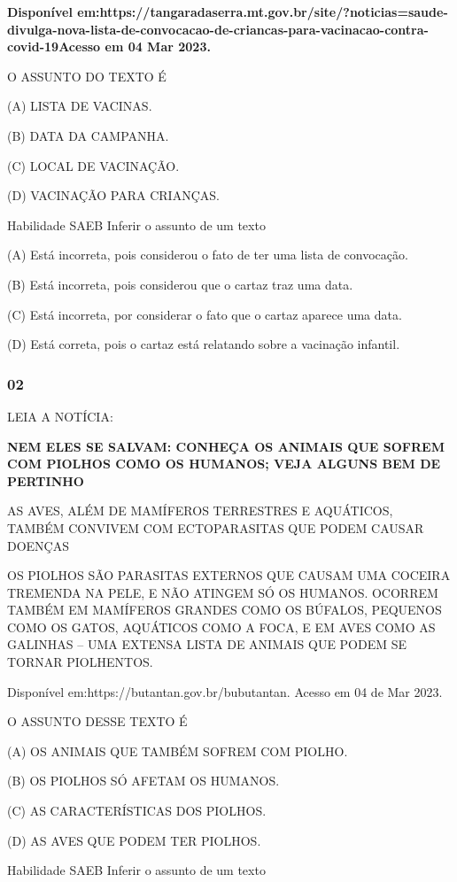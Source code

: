 \textbf{Disponível
em:https://tangaradaserra.mt.gov.br/site/?noticias=saude-divulga-nova-lista-de-convocacao-de-criancas-para-vacinacao-contra-covid-19Acesso
em 04 Mar 2023.}

O ASSUNTO DO TEXTO É

(A) LISTA DE VACINAS.

(B) DATA DA CAMPANHA.

(C) LOCAL DE VACINAÇÃO.

(D) VACINAÇÃO PARA CRIANÇAS.

Habilidade SAEB Inferir o assunto de um texto

(A) Está incorreta, pois considerou o fato de ter uma lista de
convocação.

(B) Está incorreta, pois considerou que o cartaz traz uma data.

(C) Está incorreta, por considerar o fato que o cartaz aparece uma data.

(D) Está correta, pois o cartaz está relatando sobre a vacinação
infantil.

\subsubsection{02}\label{section-66}

LEIA A NOTÍCIA:

\textbf{NEM ELES SE SALVAM: CONHEÇA OS ANIMAIS QUE SOFREM COM PIOLHOS
COMO OS HUMANOS; VEJA ALGUNS BEM DE PERTINHO}

AS AVES, ALÉM DE MAMÍFEROS TERRESTRES E AQUÁTICOS, TAMBÉM CONVIVEM COM
ECTOPARASITAS QUE PODEM CAUSAR DOENÇAS

OS PIOLHOS SÃO PARASITAS EXTERNOS QUE CAUSAM UMA COCEIRA TREMENDA NA
PELE, E NÃO ATINGEM SÓ OS HUMANOS. OCORREM TAMBÉM EM MAMÍFEROS GRANDES
COMO OS BÚFALOS, PEQUENOS COMO OS GATOS, AQUÁTICOS COMO A FOCA, E EM
AVES COMO AS GALINHAS -- UMA EXTENSA LISTA DE ANIMAIS QUE PODEM SE
TORNAR PIOLHENTOS.

Disponível em:https://butantan.gov.br/bubutantan. Acesso em 04 de Mar
2023.

O ASSUNTO DESSE TEXTO É

(A) OS ANIMAIS QUE TAMBÉM SOFREM COM PIOLHO.

(B) OS PIOLHOS SÓ AFETAM OS HUMANOS.

(C) AS CARACTERÍSTICAS DOS PIOLHOS.

(D) AS AVES QUE PODEM TER PIOLHOS.

Habilidade SAEB Inferir o assunto de um texto

